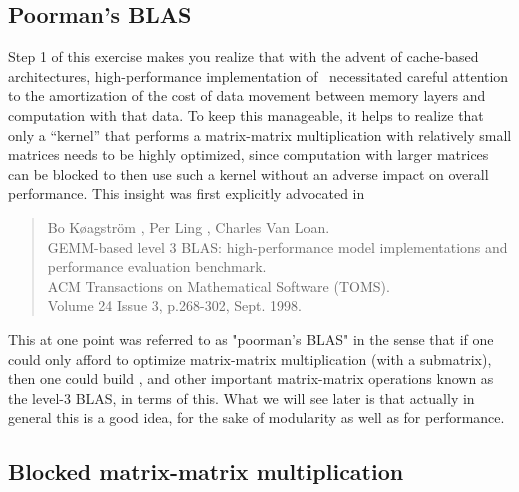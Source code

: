 \subsection{Poorman's BLAS}

Step 1 of this exercise makes you realize that
with the advent of cache-based architectures, high-performance implementation of \Gemm\ necessitated careful attention to 
the amortization of the cost of data movement between memory layers and computation with that data.
To keep this manageable, it helps to realize that only a ``kernel'' that performs a  matrix-matrix multiplication with relatively small matrices needs to be highly optimized, since
computation with larger matrices can be blocked to then use such a kernel without an adverse impact on overall performance.  This 
insight was first explicitly advocated in~\cite{poorman:journal}
\begin{quote}
	Bo K\o{a}gstr\"{o}m , Per Ling , Charles Van Loan.\\
	GEMM-based level 3 BLAS: high-performance model implementations and performance evaluation benchmark. \\
	ACM Transactions on Mathematical Software (TOMS). \\
	Volume 24 Issue 3, p.268-302, Sept. 1998.
\end{quote}
This at one point was referred to as "poorman's BLAS" in the sense that if one could only afford to optimize matrix-matrix multiplication (with a submatrix), then one could build \Gemm, and other important matrix-matrix operations known as the level-3 BLAS, in terms of this.  What we will see later is that actually in general this is a good idea, for the sake of modularity as well as for performance.

\subsection{Blocked matrix-matrix multiplication}

